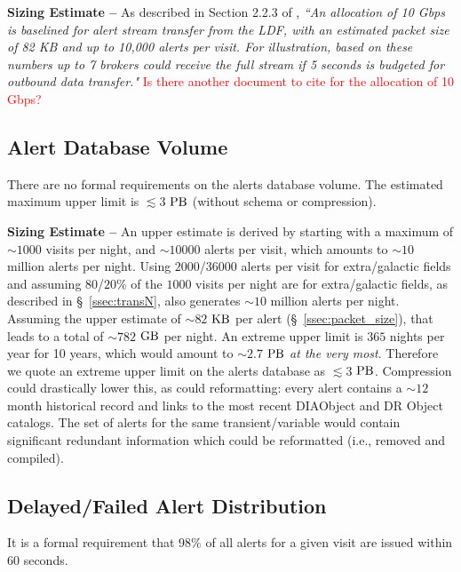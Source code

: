 \documentclass[DM,authoryear,toc]{lsstdoc}
\begin{document}
{\bf Sizing Estimate --} As described in Section 2.2.3 of , {\it ``An allocation of 10 Gbps is baselined for alert stream transfer from the LDF, with an estimated packet size of 82 KB and up to 10,000 alerts per visit. For illustration, based on these numbers up to 7 brokers could receive the full stream if 5 seconds is budgeted for outbound data transfer."} \textcolor{red}{Is there another document to cite for the allocation of 10 Gbps?}


\subsection{Alert Database Volume}\label{ssec:adb_volume}

There are no formal requirements on the alerts database volume. The estimated maximum upper limit is $\lesssim3$ $\rm PB$ (without schema or compression).

{\bf Sizing Estimate --} An upper estimate is derived by starting with a maximum of $\sim1000$ visits per night, and $\sim10000$ alerts per visit, which amounts to $\sim10$ million alerts per night. Using $2000$/$36000$ alerts per visit for extra/galactic fields and assuming $80$/$20$\% of the $1000$ visits per night are for extra/galactic fields, as described in \S~\ref{ssec:transN}, also generates $\sim 10$ million alerts per night. Assuming the upper estimate of $\sim82$ $\rm KB$ per alert (\S~\ref{ssec:packet_size}), that leads to a total of $\sim782$ $\rm GB$ per night. An extreme upper limit is $365$ nights per year for 10 years, which would amount to $\sim2.7$ $\rm PB$ {\it at the very most}. Therefore we quote an extreme upper limit on the alerts database as $\lesssim3$ $\rm PB$. Compression could drastically lower this, as could reformatting: every alert contains a $\sim12$ month historical record and links to the most recent DIAObject and DR Object catalogs. The set of alerts for the same transient/variable would contain significant redundant information which could be reformatted (i.e., removed and compiled). 

\subsection{Delayed/Failed Alert Distribution}\label{ssec:OTR1}

It is a formal requirement that $98\%$ of all alerts for a given visit are issued within $60$ seconds.
\end{document}

